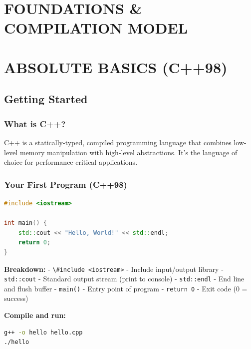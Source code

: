 \hypertarget{foundations-compilation-model}{%
\chapter{FOUNDATIONS \& COMPILATION
MODEL}\label{foundations-compilation-model}}

\hypertarget{absolute-basics-c98}{%
\chapter{ABSOLUTE BASICS (C++98)}\label{absolute-basics-c98}}

\hypertarget{getting-started}{%
\section{Getting Started}\label{getting-started}}

\hypertarget{what-is-c}{%
\subsection{What is C++?}\label{what-is-c}}

C++ is a statically-typed, compiled programming language that combines
low-level memory manipulation with high-level abstractions. It's the
language of choice for performance-critical applications.

\hypertarget{your-first-program-c98}{%
\subsection{Your First Program (C++98)}\label{your-first-program-c98}}

\begin{lstlisting}[language={C++}]
#include <iostream>

int main() {
    std::cout << "Hello, World!" << std::endl;
    return 0;
}
\end{lstlisting}

\textbf{Breakdown:} - \passthrough{\lstinline!\#include <iostream>!} -
Include input/output library - \passthrough{\lstinline!std::cout!} -
Standard output stream (print to console) -
\passthrough{\lstinline!std::endl!} - End line and flush buffer -
\passthrough{\lstinline!main()!} - Entry point of program -
\passthrough{\lstinline!return 0!} - Exit code (0 = success)

\textbf{Compile and run:}

\begin{lstlisting}[language=bash]
g++ -o hello hello.cpp
./hello
\end{lstlisting}

